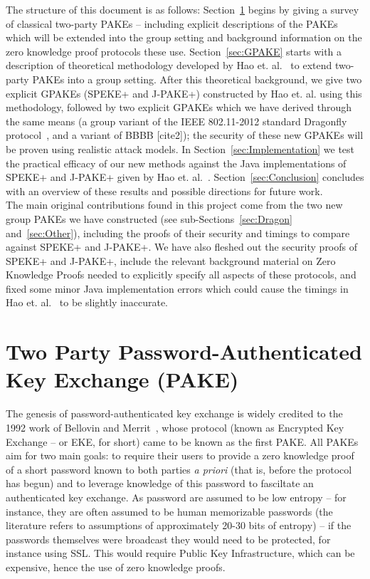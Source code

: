 \documentclass{amsart}
\theoremstyle{remark}
\begin{document}
The structure of this document is as follows: Section~\ref{sec:PAKE} begins by giving a survey of classical two-party PAKEs -- including explicit descriptions of the PAKEs which will be extended into the group setting and background information on the zero knowledge proof protocols these use.  Section~\ref{sec:GPAKE} starts with a description of theoretical methodology developed by Hao et. al.~\cite{HaYiChSh15} to extend two-party PAKEs into a group setting.  After this theoretical background, we give two explicit GPAKEs (SPEKE+ and J-PAKE+) constructed by Hao et. al. using this methodology, followed by two explicit GPAKEs which we have derived through the same means (a group variant of the IEEE 802.11-2012 standard Dragonfly protocol~\cite{Ha15}, and a variant of BBBB [cite2]); the security of these new GPAKEs will be proven using realistic attack models.  In Section~\ref{sec:Implementation} we test the practical efficacy of our new methods against the Java implementations of SPEKE+ and J-PAKE+ given by Hao et. al.~\cite{HaYiChSh15}.  Section~\ref{sec:Conclusion} concludes with an overview of these results and possible directions for future work.
\\ 

The main original contributions found in this project come from the two new group PAKEs we have constructed (see sub-Sections~\ref{sec:Dragon} and~\ref{sec:Other}), including the proofs of their security and timings to compare against SPEKE+ and J-PAKE+.  We have also fleshed out the security proofs of SPEKE+ and J-PAKE+, include the relevant background material on Zero Knowledge Proofs needed to explicitly specify all aspects of these protocols, and fixed some minor Java implementation errors which could cause the timings in Hao et. al.~\cite{HaYiChSh15} to be slightly inaccurate.


\section{Two Party Password-Authenticated Key Exchange (PAKE)} 
\label{sec:PAKE}
 The genesis of password-authenticated key exchange is widely credited to the 1992 work of Bellovin and Merrit~\cite{BeMe92}, whose protocol (known as Encrypted Key Exchange -- or EKE, for short) came to be known as the first PAKE.  All PAKEs aim for two main goals: to require their users to provide a zero knowledge proof of a short password known to both parties \emph{a priori} (that is, before the protocol has begun) and to leverage knowledge of this password to fasciltate an authenticated key exchange.  As password are assumed to be low entropy -- for instance, they are often assumed to be human memorizable passwords (the literature refers to assumptions of approximately 20-30 bits of entropy) -- if the passwords themselves were broadcast they would need to be protected, for instance using SSL.  This would require Public Key Infrastructure, which can be expensive, hence the use of zero knowledge proofs.
 \\
\end{document}
